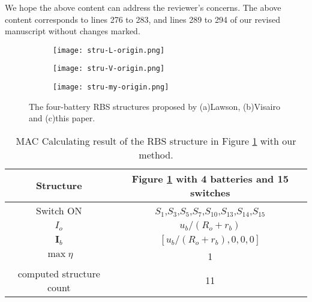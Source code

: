 \begin{revresponse}
We hope the above content can address the reviewer's concerns.
The above content corresponds to lines 276 to 283, and lines 289 to 294 of our revised manuscript without changes marked.

\begin{figure}[htbp]
    \centering
    \begin{subfigure}[b]{0.2\textwidth}
        \texttt{[image: stru-L-origin.png]}
        \caption{}
        \label{fig:study-stru-Lawson-comment}
    \end{subfigure}
    \hspace{0.02\textwidth}
    \begin{subfigure}[b]{0.4\textwidth}
        \texttt{[image: stru-V-origin.png]}
        \caption{}
        \label{fig:study-stru-Visairo-comment}
    \end{subfigure}
    \hspace{0.02\textwidth}
    \begin{subfigure}[b]{0.31\textwidth}
        \texttt{[image: stru-my-origin.png]}
        \caption{}
        \label{fig:study-stru-my-comment}
    \end{subfigure}
    \caption{The four-battery RBS structures proposed by (a)Lawson\cite{lawsonSoftwareConfigurableBattery2012}, (b)Visairo\cite{visairoReconfigurableBatteryPack2008} and (c)this paper.}
\end{figure}

\begin{table}[htbp]
  \centering
    \caption{MAC Calculating result of the RBS structure in Figure \ref{fig:study-stru-Lawson-comment} with our method.}
    \begin{tabular}{cc}
    \toprule
        Structure & Figure \ref{fig:study-stru-Lawson-comment} with 4 batteries and 15 switches  \\
    \midrule
    Switch ON & $S_1$,$S_3$,$S_5$,$S_7$,$S_{10}$,$S_{13}$,$S_{14}$,$S_{15}$ \\
    $I_o$ & $u_b/(R_o+r_b)$ \\
    $\bm{I}_b$ & $[u_b/(R_o+r_b),0,0,0]$ \\
    $\max  \eta$     & 1 \\
    computed structure count & 11 \\
    \bottomrule
    \end{tabular}
  \label{tab:study-results-Lawson-greedy}
\end{table}


\end{revresponse}
